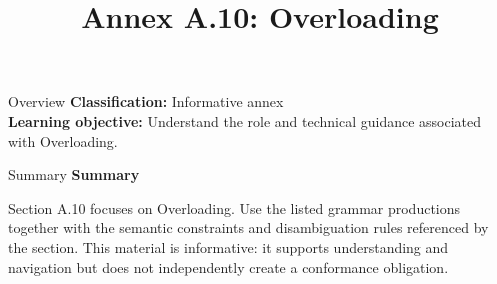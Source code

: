 \documentclass[10pt,letterpaper]{article}
\title{Annex A.10: Overloading}
\author{}
\date{}
\begin{document}
\maketitle
\begin{CornellOverviewBox}{Overview}
\textbf{Classification:} Informative annex\\[2pt]
\textbf{Learning objective:} Understand the role and technical guidance associated with Overloading.
\end{CornellOverviewBox}\begin{CornellSummaryBox}{Summary}
{\sffamily\bfseries\color{Accent} Summary}\par\vspace{3pt}Section A.10 focuses on Overloading. Use the listed grammar productions together with the semantic constraints and disambiguation rules referenced by the section. This material is informative: it supports understanding and navigation but does not independently create a conformance obligation.
\end{CornellSummaryBox}
\end{document}
